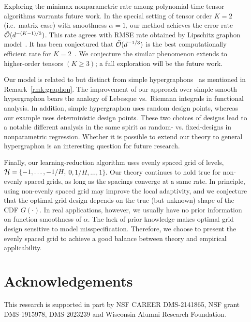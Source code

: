 \documentclass[twoside,11pt]{article}
\theoremstyle{definition}
\begin{document}
Exploring the minimax nonparametric rate among polynomial-time tensor algorithms warrants future work. In the special setting of tensor order $K = 2$ (i.e.\ matrix case) with smoothness $\alpha=1$, our method achieves the error rate $\tilde{\mathcal{O}}(d^{-(K-1)/3})$. This rate agrees with RMSE rate obtained by Lipschitz graphon model~\citep{xu2018rates}. It has been conjectured that $\tilde {\mathcal{O}}(d^{-1/3})$ is the best computationally efficient rate for $K=2$~\citep{xu2018rates,zhang2018network}. We conjecture the similar phenomenon extends to higher-order tensors $(K\geq 3)$; a full exploration will be the future work. 

Our model is related to but distinct from simple hypergraphons~\citep{balasubramanian2021nonparametric} as mentioned in Remark~\ref{rmk:graphon}. 
The improvement of our approach over simple smooth hypergraphon bears the analogy of Lebesque vs.\ Riemann integrals in functional analysis. In addition, simple hypergraphon uses random design points, whereas our example uses deterministic design points. These two choices of designs lead to a notable different analysis in the same spirit as random- vs. fixed-designs in nonparametric regression. Whether it is possible to extend our theory to general hypergraphon is an interesting question for future research.

Finally, our learning-reduction algorithm uses evenly spaced grid of levels, $\mathcal{H}=\{-1,\ldots,-1/H,$ $0, 1/H,\ldots,1\}$. Our theory continues to hold true for non-evenly spaced grids, as long as the spacings converge at a same rate. In principle, using non-evenly spaced grid may improve the local adaptivity, and we conjecture that the optimal grid design depends on the true (but unknown) shape of the CDF $G(\cdot)$. In real applications, however, we usually have no prior information on function smoothness of $\alpha$. The lack of prior knowledge makes optimal grid design sensitive to model misspecification. Therefore, we choose to present the evenly spaced grid to achieve a good balance between theory and empirical applicability. 

\section*{Acknowledgements}
This research is supported in part by NSF CAREER DMS-2141865, NSF grant DMS-1915978, DMS-2023239 and Wisconsin Alumni Research Foundation.





\appendix
\end{document}

